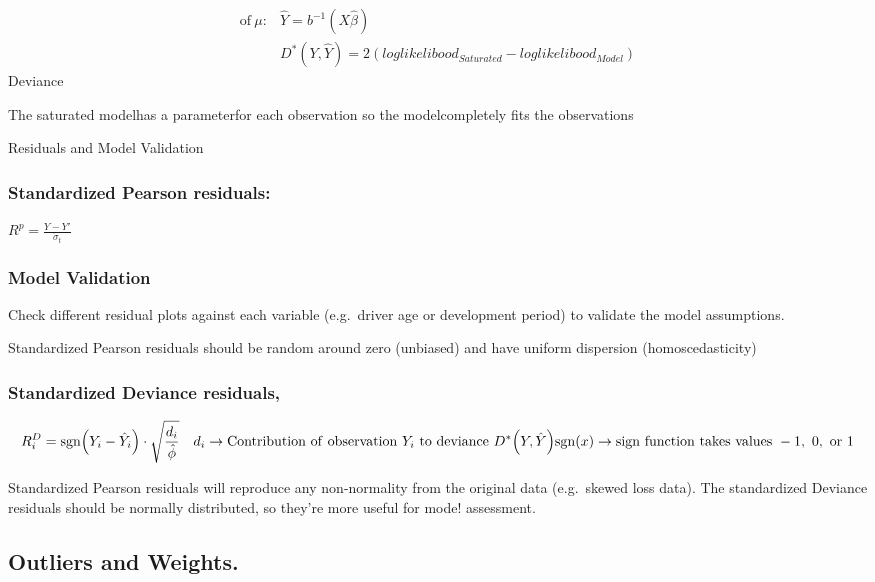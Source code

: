 \documentclass[
]{article}
\begin{document}
\[\begin{aligned}\mathrm{of}\:\mu:&\hat{Y}=b^{-1}\left(X\hat{\beta}\right)\\&D^{*}\left(Y,\hat{Y}\right)=2\left(loglikelibood_{Saturated}-loglikelibood_{Model}\right)\end{aligned}\]
Deviance

The saturated modelhas a parameterfor each observation so the
modelcompletely fits the observations

Residuals and Model Validation

\subsubsection{Standardized Pearson
residuals:}\label{standardized-pearson-residuals}

\(R^p = \frac{Y - Y'}{\dot{\sigma}_t}\)

\subsubsection{Model Validation}\label{model-validation}

Check different residual plots against each variable (e.g.~driver age or
development period) to validate the model assumptions.

Standardized Pearson residuals should be random around zero (unbiased)
and have uniform dispersion (homoscedasticity)

\subsubsection{Standardized Deviance
residuals,}\label{standardized-deviance-residuals}

\[R_{i}^{D}=\mathrm{sgn}\Big(Y_{i}-\hat{Y}_{i}\Big)\cdot\sqrt{\frac{d_{i}}{\hat{\phi}}}\quad d_{i}\to\mathrm{Contribution~of~observation~}Y_{i}\mathrm{~to~deviance~}D^{*}\Big(Y,\hat{Y}\Big)\\\mathrm{sgn}(x)\to\mathrm{sign~function~takes~values~-1,~0,~or~1}\]

Standardized Pearson residuals will reproduce any non-normality from the
original data (e.g.~skewed loss data). The standardized Deviance
residuals should be normally distributed, so they're more useful for
mode! assessment.

\subsection{Outliers and Weights.}\label{outliers-and-weights.}
\end{document}
